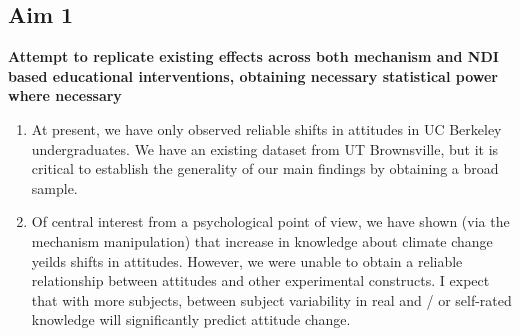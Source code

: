 
\subsection{Aim 1}

\textbf{Attempt to replicate existing effects across both mechanism and NDI based
    educational interventions, obtaining necessary statistical power where
    necessary}


\begin{enumerate}
    \item At present, we have only observed reliable shifts in attitudes in UC
        Berkeley undergraduates. We have an existing dataset from UT
        Brownsville, but it is critical to establish the generality of our main
        findings by obtaining a broad sample.
    \item Of central interest from a psychological point of view, we have shown
        (via the mechanism manipulation) that increase in knowledge about
        climate change yeilds shifts in attitudes. However, we were unable to
        obtain a reliable relationship between attitudes and other experimental
        constructs. I expect that with more subjects, between subject
        variability in real and / or self-rated knowledge will significantly
        predict attitude change.
\end{enumerate}


